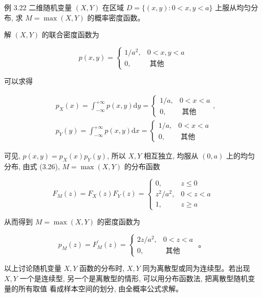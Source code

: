 \documentclass{beamer}
\begin{document}
	\begin{frame}
		例 3.22 二维随机变量 $(X, Y)$ 在区域 $D=\{(x, y): 0<x, y<a\}$ 上服从均匀分布, 求 $M=\max (X, Y)$ 的概率密度函数。
	\end{frame}
	
	\begin{frame}
		解 $(X, Y)$ 的联合密度函数为
		
		$$
		p(x, y)=\left\{\begin{array}{cc}
			1 / a^{2}, & 0<x, y<a \\
			0, & \text { 其他 }
		\end{array}\right.
		$$
		
		可以求得
		
		$$
		\begin{aligned}
			& p_{X}(x)=\int_{-\infty}^{+\infty} p(x, y) \mathrm{d} y=\left\{\begin{array}{cc}
				1 / a, & 0<x<a \\
				0, & \text { 其他 }
			\end{array},\right. \\
			& p_{Y}(y)=\int_{-\infty}^{+\infty} p(x, y) \mathrm{d} x=\left\{\begin{array}{cc}
				1 / a, & 0<x<a \\
				0, & \text { 其他 }
			\end{array}\right.
		\end{aligned}
		$$
		
		可见, $p(x, y)=p_{X}(x) p_{Y}(y)$, 所以 $X, Y$ 相互独立, 均服从 $(0, a)$ 上的均匀分布, 由式 (3.26), $M=\max (X, Y)$ 的分布函数
		
		$$
		F_{M}(z)=F_{X}(z) F_{Y}(z)=\left\{\begin{array}{cc}
			0, & z \leq 0 \\
			z^{2} / a^{2}, & 0<z<a \\
			1, & z \geq a
		\end{array}\right.
		$$
		
		
	\end{frame}
	
	\begin{frame}
		从而得到 $M=\max (X, Y)$ 的密度函数为
		
		$$
		p_{M}(z)=F_{M}^{\prime}(z)=\left\{\begin{array}{cc}
			2 z / a^{2}, & 0<z<a \\
			0, & \text { 其他 }
		\end{array}\right. \text { 。 }
		$$
		
		以上讨论随机变量 $X, Y$ 函数的分布时, $X, Y$ 同为离散型或同为连续型。若出现 $X, Y$ 一个是连续型, 另一个是离散型的情形, 可以用分布函数法, 把离散型随机变量的所有取值 看成样本空间的划分, 由全概率公式求解。
	\end{frame}
	
\end{document}
